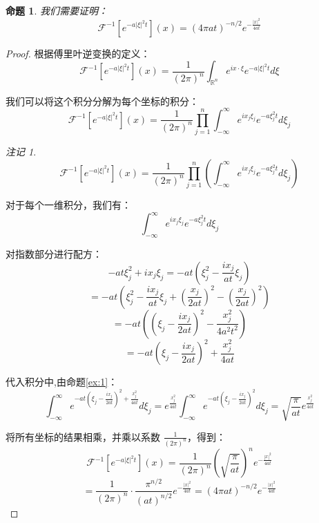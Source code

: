 \documentclass[12pt,a4paper]{article}
\numberwithin{subsection}{section}   %
\numberwithin{subsubsection}{subsection}
\theoremstyle{plain}
\newtheorem{proposition}[theorem]{命题}
\theoremstyle{definition}
\theoremstyle{remark}
\newtheorem{remark}[theorem]{注记}
\theoremstyle{remark}
\begin{document}
	\begin{proposition}
		我们需要证明：
		\[
		\mathcal{F}^{-1}\left[e^{-a|\xi|^2 t}\right](x) = (4\pi a t)^{-n/2} e^{-\frac{|x|^2}{4a t}}
		\]
	\end{proposition}
	
	
	
	\begin{proof}
		
		根据傅里叶逆变换的定义：
		\[
		\mathcal{F}^{-1}\left[e^{-a|\xi|^2 t}\right](x) = \frac{1}{(2\pi)^n} \int_{\mathbb{R}^n} e^{i x \cdot \xi} e^{-a|\xi|^2 t} d\xi
		\]
		
		我们可以将这个积分分解为每个坐标的积分：
		\[
		\mathcal{F}^{-1}\left[e^{-a|\xi|^2 t}\right](x) = \frac{1}{(2\pi)^n} \prod_{j=1}^n \int_{-\infty}^\infty e^{i x_j \xi_j} e^{-a\xi_j^2 t} d\xi_j
		\]
		
		\begin{remark}
			\[
			\mathcal{F}^{-1}\left[e^{-a|\xi|^{2} t}\right](x)=\frac{1}{(2\pi)^{n}}\prod_{j=1}^{n}\left(\int_{-\infty}^{\infty} e^{i x_j \xi_j} e^{-a\xi_j^{2} t} d\xi_j\right)
			\]
		\end{remark}
		
		
		对于每个一维积分，我们有：
		\[
		\int_{-\infty}^\infty e^{i x_j \xi_j} e^{-a\xi_j^2 t} d\xi_j
		\]
		
		对指数部分进行配方：
		\[
		-a t \xi_j^2 + i x_j \xi_j = -a t \left( \xi_j^2 - \frac{i x_j}{a t} \xi_j \right)
		\]
		\[
		= -a t \left( \xi_j^2 - \frac{i x_j}{a t} \xi_j + \left( \frac{x_j}{2a t} \right)^2 - \left( \frac{x_j}{2a t} \right)^2 \right)
		\]
		\[
		= -a t \left( \left( \xi_j - \frac{i x_j}{2a t} \right)^2 - \frac{x_j^2}{4a^2 t^2} \right)
		\]
		\[
		= -a t \left( \xi_j - \frac{i x_j}{2a t} \right)^2 + \frac{x_j^2}{4a t}
		\]
		
		代入积分中,由命题\eqref{ex:1}：
		\[
		\int_{-\infty}^\infty e^{-a t \left( \xi_j - \frac{i x_j}{2a t} \right)^2 + \frac{x_j^2}{4a t}} d\xi_j = e^{\frac{x_j^2}{4a t}} \int_{-\infty}^\infty e^{-a t \left( \xi_j - \frac{i x_j}{2a t} \right)^2} d\xi_j= \sqrt{\frac{\pi}{a t}} e^{\frac{x_j^2}{4a t}}
		\]
		
		
		将所有坐标的结果相乘，并乘以系数 \( \frac{1}{(2\pi)^n} \)，得到：
		\[
		\mathcal{F}^{-1}\left[e^{-a|\xi|^2 t}\right](x) = \frac{1}{(2\pi)^n} \left( \sqrt{\frac{\pi}{a t}} \right)^n e^{-\frac{|x|^2}{4a t}}
		\]
		\[
		= \frac{1}{(2\pi)^n} \cdot \frac{\pi^{n/2}}{(a t)^{n/2}} e^{-\frac{|x|^2}{4a t}} = (4\pi a t)^{-n/2} e^{-\frac{|x|^2}{4a t}}
		\]
		
	\end{proof}
	
\end{document}
